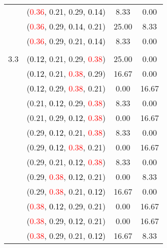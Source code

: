 \documentclass[10pt,a4paper]{report}
\begin{document}
\begin{center}
\begin{longtable}{clcc}
			&(\textcolor{red}{0.36}, 0.21, 0.29, \textcolor{black}{0.14})&8.33&0.00\\
			&(\textcolor{red}{0.36}, 0.29, \textcolor{black}{0.14}, 0.21)&25.00&8.33\\
			&(\textcolor{red}{0.36}, 0.29, 0.21, \textcolor{black}{0.14})&8.33&0.00\\
		&&&\\
		3.3			&(\textcolor{black}{0.12}, 0.21, 0.29, \textcolor{red}{0.38})&25.00&0.00\\
			&(\textcolor{black}{0.12}, 0.21, \textcolor{red}{0.38}, 0.29)&16.67&0.00\\
			&(\textcolor{black}{0.12}, 0.29, \textcolor{red}{0.38}, 0.21)&0.00&16.67\\
			&(0.21, \textcolor{black}{0.12}, 0.29, \textcolor{red}{0.38})&8.33&0.00\\
			&(0.21, 0.29, \textcolor{black}{0.12}, \textcolor{red}{0.38})&0.00&16.67\\
			&(0.29, \textcolor{black}{0.12}, 0.21, \textcolor{red}{0.38})&8.33&0.00\\
			&(0.29, \textcolor{black}{0.12}, \textcolor{red}{0.38}, 0.21)&0.00&16.67\\
			&(0.29, 0.21, \textcolor{black}{0.12}, \textcolor{red}{0.38})&8.33&0.00\\
			&(0.29, \textcolor{red}{0.38}, \textcolor{black}{0.12}, 0.21)&0.00&8.33\\
			&(0.29, \textcolor{red}{0.38}, 0.21, \textcolor{black}{0.12})&16.67&0.00\\
			&(\textcolor{red}{0.38}, \textcolor{black}{0.12}, 0.29, 0.21)&0.00&16.67\\
			&(\textcolor{red}{0.38}, 0.29, \textcolor{black}{0.12}, 0.21)&0.00&16.67\\
			&(\textcolor{red}{0.38}, 0.29, 0.21, \textcolor{black}{0.12})&16.67&8.33\\
		\bottomrule
	\end{longtable}
\end{center}
\end{document}
